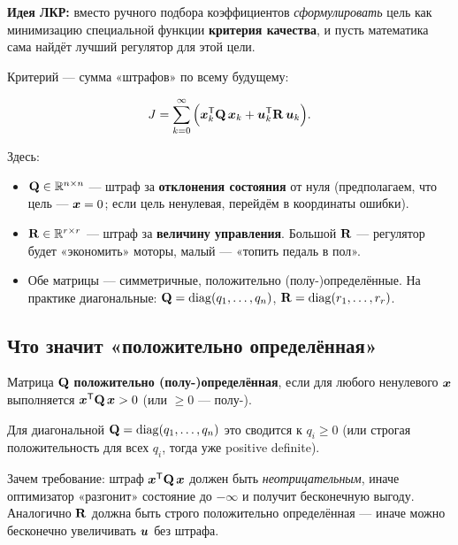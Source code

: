 \begin{ideabox}
\textbf{Идея ЛКР:} вместо ручного подбора коэффициентов
\emph{сформулировать} цель как минимизацию специальной функции
\textbf{критерия качества}, и пусть математика сама найдёт лучший
регулятор для этой цели.
\end{ideabox}

Критерий --- сумма «штрафов» по всему будущему:

\begin{formulabox}[title={ЛКР-критерий качества}]
\begin{equation}
  J = \sum_{k=0}^{\infty} \Big(\bm{x}_k^{\mathsf{T}} \mathbf{Q}\,\bm{x}_k +
                                  \bm{u}_k^{\mathsf{T}} \mathbf{R}\,\bm{u}_k\Big).
  \label{eq:lqr_cost}
\end{equation}
\end{formulabox}

Здесь:

\begin{itemize}
  \item $\mathbf{Q} \in \mathbb{R}^{n\times n}$ --- штраф за \textbf{отклонения
        состояния} от нуля (предполагаем, что цель --- $\bm{x} = 0$;
        если цель ненулевая, перейдём в координаты ошибки).
  \item $\mathbf{R} \in \mathbb{R}^{r\times r}$ --- штраф за \textbf{величину
        управления}. Большой $\mathbf{R}$ --- регулятор будет «экономить»
        моторы, малый --- «топить педаль в пол».
  \item Обе матрицы --- симметричные, положительно (полу-)определённые.
        На практике диагональные:
        $\mathbf{Q} = \operatorname{diag}(q_1, \ldots, q_n)$, $\mathbf{R} = \operatorname{diag}(r_1, \ldots, r_r)$.
\end{itemize}

\subsection{Что значит «положительно определённая»}

\begin{notebox}
Матрица $\mathbf{Q}$ \textbf{положительно (полу-)определённая}, если для
любого ненулевого $\bm{x}$ выполняется $\bm{x}^{\mathsf{T}} \mathbf{Q}\,\bm{x} > 0$
(или $\ge 0$ --- полу-).

Для диагональной $\mathbf{Q} = \operatorname{diag}(q_1, \ldots, q_n)$ это сводится к
$q_i \ge 0$ (или строгая положительность для всех $q_i$, тогда уже
positive definite).

Зачем требование: штраф $\bm{x}^{\mathsf{T}} \mathbf{Q}\,\bm{x}$ должен быть
\emph{неотрицательным}, иначе оптимизатор «разгонит» состояние до
$-\infty$ и получит бесконечную выгоду. Аналогично $\mathbf{R}$ должна
быть строго положительно определённая --- иначе можно бесконечно
увеличивать $\bm{u}$ без штрафа.
\end{notebox}

